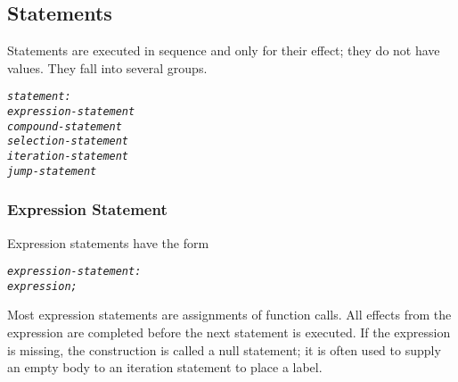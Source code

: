 \documentclass[12pt]{report}
\begin{document}
\subsection{Statements}
\begin{doublespace}
Statements are executed in sequence and only for their effect; they do not have values. They fall into several groups.
\begin{singlespace}
\begin{alltt}
         \textit{statement:}
              \textit{expression-statement}
              \textit{compound-statement}
              \textit{selection-statement}
              \textit{iteration-statement}
              \textit{jump-statement}
\end{alltt}
\end{singlespace}
\end{doublespace}

\subsubsection{Expression Statement}
\begin{doublespace}
Expression statements have the form 
\begin{singlespace}
\begin{alltt}
         \textit{expression-statement:}
              \textit{expression;}
\end{alltt}
\end{singlespace}
Most expression statements are assignments of function calls. All effects from the expression are completed before the next statement is executed. If the expression is missing, the construction is called a null statement; it is often used to supply an empty body to an iteration statement to place a label.
\end{doublespace}
\end{document}
